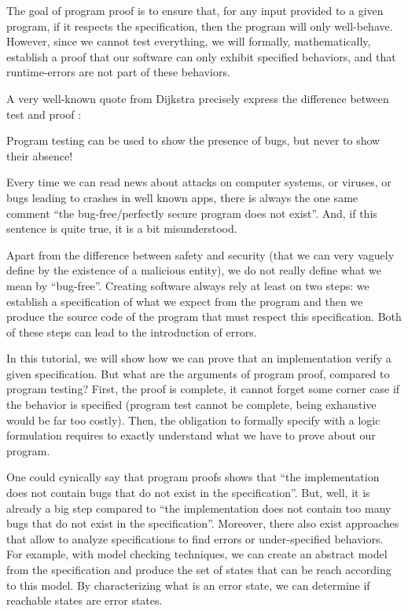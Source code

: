 \documentclass[middle]{zmdocument}
\begin{document}
The goal of program proof is to ensure that, for any input provided to a
given program, if it respects the specification, then the program will
only well-behave. However, since we cannot test everything, we will
formally, mathematically, establish a proof that our software can only
exhibit specified behaviors, and that runtime-errors are not part of
these behaviors.



A very well-known quote from Dijkstra precisely express the difference
between test and proof :



\begin{Quotation}[Dijkstra]
Program testing can be used to show the presence of bugs, but never to show 
their absence!
\end{Quotation}




Every time we can read news about attacks on computer systems, or
viruses, or bugs leading to crashes in well known apps, there is always
the one same comment ``the bug-free/perfectly secure program does not
exist''. And, if this sentence is quite true, it is a bit misunderstood.



Apart from the difference between safety and security (that we can very
vaguely define by the existence of a malicious entity), we do not really
define what we mean by ``bug-free''. Creating software always rely at
least on two steps: we establish a specification of what we expect from
the program and then we produce the source code of the program that must
respect this specification. Both of these steps can lead to the
introduction of errors.



In this tutorial, we will show how we can prove that an implementation
verify a given specification. But what are the arguments of program
proof, compared to program testing? First, the proof is complete, it
cannot forget some corner case if the behavior is specified (program
test cannot be complete, being exhaustive would be far too costly).
Then, the obligation to formally specify with a logic formulation
requires to exactly understand what we have to prove about our program.



One could cynically say that program proofs shows that ``the
implementation does not contain bugs that do not exist in the
specification''. But, well, it is already a big step compared to ``the
implementation does not contain too many bugs that do not exist in the
specification''. Moreover, there also exist approaches that allow to
analyze specifications to find errors or under-specified behaviors. For
example, with model checking techniques, we can create an abstract model
from the specification and produce the set of states that can be reach
according to this model. By characterizing what is an error state, we
can determine if reachable states are error states.
\end{document}
